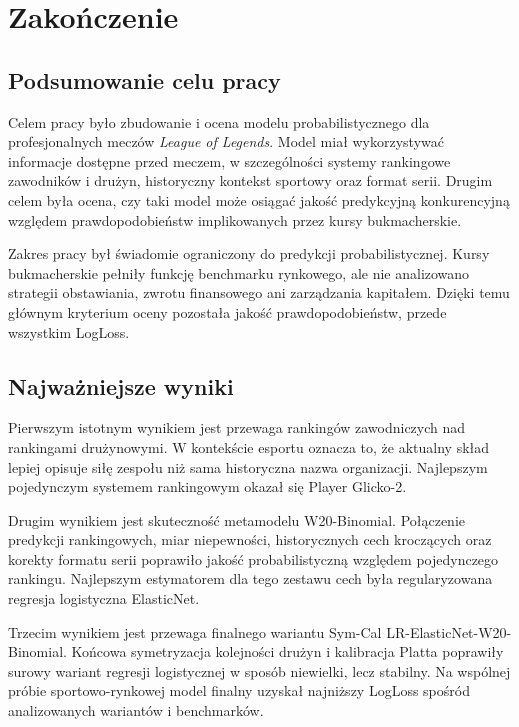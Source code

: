 \chapter{Zakończenie}

\section{Podsumowanie celu pracy}

Celem pracy było zbudowanie i ocena modelu probabilistycznego dla profesjonalnych meczów
\textit{League of Legends}. Model miał wykorzystywać informacje dostępne przed meczem, w
szczególności systemy rankingowe zawodników i drużyn, historyczny kontekst sportowy oraz format
serii. Drugim celem była ocena, czy taki model może osiągać jakość predykcyjną konkurencyjną
względem prawdopodobieństw implikowanych przez kursy bukmacherskie.

Zakres pracy był świadomie ograniczony do predykcji probabilistycznej. Kursy bukmacherskie pełniły
funkcję benchmarku rynkowego, ale nie analizowano strategii obstawiania, zwrotu finansowego ani
zarządzania kapitałem. Dzięki temu głównym kryterium oceny pozostała jakość prawdopodobieństw,
przede wszystkim LogLoss.

\section{Najważniejsze wyniki}

Pierwszym istotnym wynikiem jest przewaga rankingów zawodniczych nad rankingami drużynowymi. W
kontekście esportu oznacza to, że aktualny skład lepiej opisuje siłę zespołu niż sama historyczna
nazwa organizacji. Najlepszym pojedynczym systemem rankingowym okazał się Player Glicko-2.

Drugim wynikiem jest skuteczność metamodelu W20-Binomial. Połączenie predykcji rankingowych, miar
niepewności, historycznych cech kroczących oraz korekty formatu serii poprawiło jakość
probabilistyczną względem pojedynczego rankingu. Najlepszym estymatorem dla tego zestawu cech była
regularyzowana regresja logistyczna ElasticNet.

Trzecim wynikiem jest przewaga finalnego wariantu Sym-Cal LR-ElasticNet-W20-Binomial. Końcowa
symetryzacja kolejności drużyn i kalibracja Platta poprawiły surowy wariant regresji logistycznej w
sposób niewielki, lecz stabilny. Na wspólnej próbie sportowo-rynkowej model finalny uzyskał
najniższy LogLoss spośród analizowanych wariantów i benchmarków.

